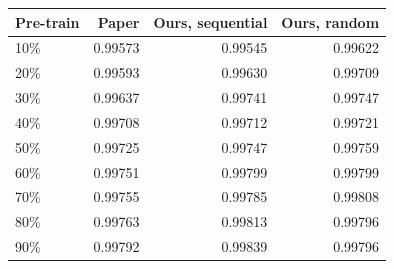 {\footnotesize
\begin{tabular}{lrrr}
\toprule
\textbf{Pre-train} & \textbf{Paper} & \textbf{Ours, sequential} & \textbf{Ours, random} \\
\midrule
10\% & 0.99573 & 0.99545 & 0.99622 \\
20\% & 0.99593 & 0.99630 & 0.99709 \\
30\% & 0.99637 & 0.99741 & 0.99747 \\
40\% & 0.99708 & 0.99712 & 0.99721 \\
50\% & 0.99725 & 0.99747 & 0.99759 \\
60\% & 0.99751 & 0.99799 & 0.99799 \\
70\% & 0.99755 & 0.99785 & 0.99808 \\
80\% & 0.99763 & 0.99813 & 0.99796 \\
90\% & 0.99792 & 0.99839 & 0.99796 \\
\bottomrule
\end{tabular}
}
